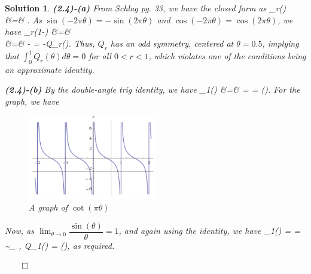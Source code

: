 \documentclass{article} %
\def\eQb#1\eQe{\begin{eqnarray*}#1\end{eqnarray*}}
\theoremstyle{quest}
\newtheorem*{solution}{Solution}
\begin{document}
\begin{solution}
\textbf{(2.4)-(a)} From Schlag pg. 33, we have the closed form as
\eQb
Q_{r}(\theta) &=& .
\eQe
As $\sin(-2\pi \theta) = -\sin(2\pi \theta)$ and $\cos(-2\pi \theta) = \cos(2\pi \theta)$,
we have 
\eQb
Q_{r}(1-\theta) &=&  \\
&=& - = -Q_{r}(\theta). 
\eQe 
Thus, $Q_r$ has an odd symmetry, centered at $\theta = 0.5$, implying that
$\int_{0}^{1} Q_r(\theta) d\theta = 0$ for all $0 < r < 1$, which violates one of the 
conditions being an approximate identity.

\bigskip

\textbf{(2.4)-(b)} By the double-angle trig identity, we have
\eQb
Q_1(\theta) &=&  
=  = \cot(\pi \theta). 
\eQe
For the graph, we have
\begin{figure}[!ht]
  \caption{A graph of $\cot(\pi \theta)$}
  \centering
    \includegraphics[width=0.5\textwidth]{cot}
\end{figure}

Now, as $\lim_{\theta \to 0} \dfrac{\sin(\theta)}{\theta} = 1$, and again using the identity,
 we have
\eQb
Q_1(\theta) = \dfrac{\cos(\pi \theta)}{\sin(\pi \theta)} 
=  \sim_{\theta {}} , 
\>  \> Q_1(\theta) = \Theta(),
\eQe
as required.

\bigskip





\hfill $\qed$
\end{solution}

\newpage
\end{document}
